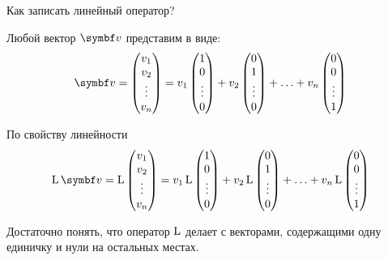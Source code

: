 \begin{frame}{Как записать линейный оператор?}

Любой вектор $\bv$ представим в виде:
\[
\bv =  \begin{pmatrix}
    v_1 \\
    v_2 \\
    \vdots \\
    v_n 
\end{pmatrix} =  
v_1  \begin{pmatrix}
    1 \\
    0 \\
    \vdots \\
    0 
\end{pmatrix} + v_2  \begin{pmatrix}
    0 \\
    1 \\
    \vdots \\
    0 
\end{pmatrix} + \ldots +
v_n  \begin{pmatrix}
    0 \\
    0 \\
    \vdots \\
    1 
\end{pmatrix}
\]

\pause
По свойству линейности
\[
\LL \bv =  \LL \begin{pmatrix}
    v_1 \\
    v_2 \\
    \vdots \\
    v_n 
\end{pmatrix} =  
v_1  \LL \begin{pmatrix}
    1 \\
    0 \\
    \vdots \\
    0 
\end{pmatrix} + v_2  \LL \begin{pmatrix}
    0 \\
    1 \\
    \vdots \\
    0 
\end{pmatrix} + \ldots +
v_n  \LL \begin{pmatrix}
    0 \\
    0 \\
    \vdots \\
    1 
\end{pmatrix}
\]

\pause
Достаточно понять, что оператор $\operatorname{L}$ делает с векторами, содержащими 
одну единичку и нули на остальных местах.

\end{frame}



